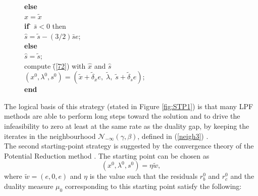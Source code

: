 \documentclass[a4paper,10 pt,titlepage,twoside]{book}
\theoremstyle{plain}
\theoremstyle{definition}
\theoremstyle{remark}
\begin{document}
{{\begin{figure}
{\begin{boxedminipage}{1\linewidth}
\begin{tabbing}
				\textbf{else} \=\\
				\> $\hat{x} = \tilde{x}$\\
				\textbf{if} \= $\bar{s}<0$ then\\
				\> $\hat{s}= \tilde{s} -(3/2)\bar{s}e$;\\
				\textbf{else} \=\\
				\> $\hat{s} = \tilde{s}$;\\
				compute \=(\ref{72}) with $\hat{x}$ and $\hat{s}$\\
				\>$(x^{0}, \lambda^{0}, s^{0}) = (\tilde{x}+\tilde{\delta}_{x} e,\;\tilde{\lambda},\;\tilde{s}+\tilde{\delta}_{s} e)$;\\
				\textbf{end}
			\end{tabbing}
		\end{boxedminipage}
		} \quad
\end{figure}
The logical basis of this strategy (stated in Figure \ref{fig:STP1}) is that many LPF methods are able to perform long steps toward the solution and to drive the infeasibility to zero at least at the same rate as the duality gap, by keeping the iterates in the neighbourhood $\mathcal{N}_{-\infty}(\gamma,\beta)$, defined in (\ref{neigh3}) \cite{SPS}.\\[1 cm]
The second starting-point strategy is suggested by the convergence theory of the Potential Reduction method \cite{SPS}. The starting point can be chosen as \begin{equation*}
(x^{0}, \lambda^{0}, s^{0}) = \eta \tilde{w},
\end{equation*}where $\tilde{w} = (e,0,e)$ and $\eta$ is the value such that the residuals $r_{b}^{0}$ and $r_{c}^{0}$ and the duality measure $\mu_{0}$ corresponding to this starting point satisfy the following:

}}
\end{document}
